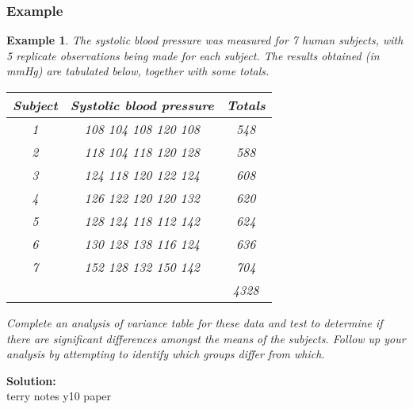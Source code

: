 \documentclass[12pt]{article}
\newtheorem{example}[theorem]{Example}
\begin{document}
\subsubsection{Example}
\begin{example}
The systolic blood pressure was measured for 7 human subjects, with 5 replicate observations being made for each subject. The results obtained (in mmHg) are tabulated below, together with some totals.
\begin{center}
\begin{tabular}{|c|c|c|}
                                  \hline
                                  Subject & Systolic blood pressure & Totals \\ \hline
                                  1 & 108 104 108 120 108 & 548 \\
                                  2 & 118 104 118 120 128 & 588 \\
                                  3 & 124 118 120 122 124 & 608 \\
                                  4 & 126 122 120 120 132 & 620 \\
                                  5 & 128 124 118 112 142 & 624 \\
                                  6 & 130 128 138 116 124 & 636 \\
                                  7 & 152 128 132 150 142 & 704 \\
                                    &                     & 4328 \\
                                  \hline
                                \end{tabular}
\end{center}
Complete an analysis of variance table for these data and test to determine if there are significant differences amongst the means of the subjects. Follow up your analysis by attempting to identify which groups differ from which.
\end{example}

\begin{mdframed}
{\bf Solution:}\\
\textcolor[rgb]{1.00,1.00,1.00}{terry notes y10 paper\lipsum[1-8]}
\end{mdframed}
\end{document}
